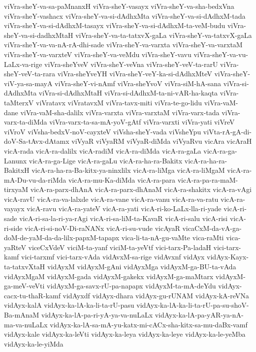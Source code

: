 {viVra-sheY-va-sa-paMnanxH
viVra-sheY-vasayx
viVra-sheY-va-sha-bedxVna
viVra-sheY-vashacx
viVra-sheY-va-si-dAdhxMta
viVra-sheY-va-si-dAdhxM-tada
viVra-sheY-va-si-dAdhxM-tasayx
viVra-sheY-va-si-dAdhxM-ta-veM-budu
viVra-sheY-va-si-dadhxMtaH
viVra-sheY-va-ta-tatxvX-gaLa
viVra-sheY-va-tatxvX-gaLa
viVra-sheY-va-va-nA-rA-dhi-sade
viVra-sheY-va-varxta
viVra-sheY-va-varxtaM
viVra-sheY-va-varxteV
viVra-sheY-va-veMdu
viVra-sheY-vavu
viVra-sheY-va-vu-LaLx-va-rige
viVra-sheYveV
viVra-sheY-veVna
viVra-sheY-veV-ta-rarU
viVra-sheY-veV-ta-rara
viVra-sheYveYH
viVra-sheY-veY-ka-si-dAdhxMteV
viVra-sheY-viV-ya-sa-mayA
viVra-sheY-vi-nAmf
viVra-sheYvoV
viVra-siM-hA-sana
viVra-si-dAdhxMta
viVra-si-dAdhxMtaH
viVra-si-dAdhxM-ta-ni-vAR-ha-kaqta
viVra-taMterxV
viVratavx
viVratavxM
viVra-tavx-miti
viVra-te-go-lidu
viVra-vaM-dane
viVra-vaM-sha-dalilx
viVra-varxta
viVra-varxtaM
viVra-varx-tada
viVra-varx-ta-diMda
viVra-varx-ta-sa-mA-yoV-gAtf
viVra-varxti
viVra-yati
viVreV
viVroV
viVsha-bedxV-noV-cayxteV
viVsha-sheY-vada
viVsheYpu
viVta-rA-gA-di-doV-Sa-tAvx-dAtamx
viVyaR
viVyaRM
viVyaR-diMda
viVyaRvu
vicAra
vicAraH
vicA-rada
vicA-ra-dalilx
vicA-radiM
vicA-ra-diMda
vicA-ra-gaLa
vicA-ra-ga-Lanunx
vicA-ra-ga-Lige
vicA-ra-gaLu
vicA-ra-ha-ra-Bakitx
vicA-ra-ha-ra-BakitxH
vicA-ra-ha-ra-Ba-kitx-ya-ninxlilx
vicA-ra-liMga
vicA-ra-liMgaM
vicA-ra-mA-Du-vu-da-riMda
vicA-ra-mu-Ka-diMda
vicA-ra-para
vicA-ra-pa-ra-maM-tirxyaM
vicA-ra-parx-dhAnA
vicA-ra-parx-dhAnaM
vicA-ra-shakitx
vicA-ra-vAgi
vicA-ravU
vicA-ra-va-lalxde
vicA-ra-vane
vicA-ra-vanu
vicA-ra-va-ratu
vicA-ra-vayayx
vicA-ravu
vicA-ra-yateV
vicA-ra-yati
vicA-ri-ko-LaLx-lla-ri-yade
vicA-ri-sade
vicA-ri-sa-la-ri-ya-rAgi
vicA-ri-sa-liM-ta-KavaR
vicA-ri-salu
vicA-risi
vicA-ri-side
vicA-ri-si-noV-Di-raNANx
vicA-ri-su-vude
vicAyaR
vicaCxM-da-vA-ga-doM-de-yaM-da-da-lilx-papxM-tapapx
vica-li-ta-nA-gu-vaMte
vica-raMti
vica-yaRteV
viceCxVdeV
viciM-ta-yanf
viciM-ta-yeVtf
vici-tarx-Pa-ladaH
vici-tarx-kamf
vici-tarxmf
vici-tarx-vAda
vidAvxM-sa-rige
vidAvxnf
vidAyx
vidAyx-Kayx-ta-tatxvXtaH
vidAyxM
vidAyxM-gAni
vidAyxMga
vidAyxM-ga-BU-ta-vAda
vidAyxMgaM
vidAyxM-gada
vidAyxM-gakekx
vidAyxM-ga-maMtarx
vidAyxM-ga-meV-veVti
vidAyxM-ga-savx-rU-pa-napapx
vidAyxM-ta-mA-deYdu
vidAyx-cacx-tu-thaR-kamf
vidAyxdf
vidAyx-dhara
vidAyx-gu-rUNAM
vidAyx-kA-reVNa
vidAyx-kalA
vidAyx-ka-lA-ka-li-ta-rU-pasu
vidAyx-ka-lA-ka-li-ta-rU-pa-su-shoV-Ba-mAnaM
vidAyx-ka-lA-pa-ri-yA-ya-va-nuLaLx
vidAyx-ka-lA-pa-yAR-ya-nA-ma-va-nuLaLx
vidAyx-ka-lA-sa-mA-yu-katx-mi-cACx-sha-kitx-sa-mu-daBx-vamf
vidAyx-kale
vidAyx-ka-leVti
vidAyx-ka-leya
vidAyx-ka-leye
vidAyx-ka-le-yeMba
vidAyx-ka-le-yiMda
}
